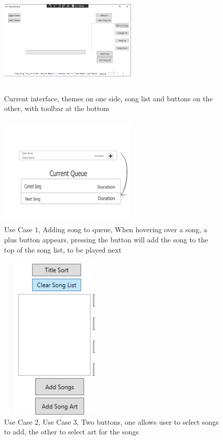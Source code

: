 \documentclass[10pt,conference,onecolumn,compsoc]{IEEEtran}
\begin{document}
\begin{figure}
\includegraphics[height=200px, width=250px]{Jammer_Light_Theme.png}
\caption{Current interface, themes on one side, song list and buttons on the other, with toolbar at the bottom}
\label{CurInterface}
\end{figure}

\begin{figure}
\includegraphics[height=200px, width=250px]{Add_Song_Queue_Mock_Up.jpg}
\caption{Use Case 1, Adding song to queue, When hovering over a song, a plus button appears, pressing the button will add the song to the top of the song list, to be played next}
\label{AddQueue}
\end{figure}

\begin{figure}
\includegraphics[height=300px, width=200px]{Add_Song_Add_Art.png}
\caption{Use Case 2, Use Case 3, Two buttons, one allows user to select songs to add, the other to select art for the songs}
\label{AddSongAddArt}
\end{figure}
\end{document}

